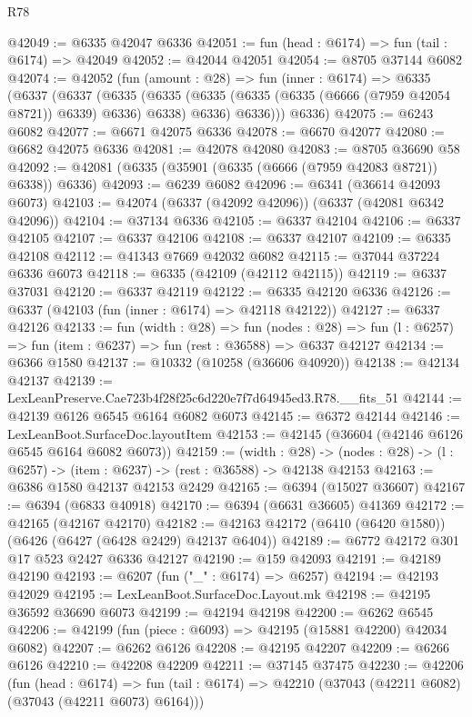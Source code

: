 \begin{lexlean}{R78}
\begin{coremodule}
@42049 := @6335 @42047 @6336
@42051 := fun (head : @6174) => fun (tail : @6174) => @42049
@42052 := @42044 @42051
@42054 := @8705 @37144 @6082
@42074 := @42052
    (fun (amount : @28) =>
    fun (inner : @6174) =>
    @6335
      (@6337
        (@6337
          (@6335
            (@6335 (@6335 (@6335 (@6335 (@6666 (@7959 @42054 @8721)) @6339) @6336) @6338) @6336)
            @6336)))
      @6336)
@42075 := @6243 @6082
@42077 := @6671 @42075 @6336
@42078 := @6670 @42077
@42080 := @6682 @42075 @6336
@42081 := @42078 @42080
@42083 := @8705 @36690 @58
@42092 := @42081 (@6335 (@35901 (@6335 (@6666 (@7959 @42083 @8721)) @6338)) @6336)
@42093 := @6239 @6082
@42096 := @6341 (@36614 @42093 @6073)
@42103 := @42074 (@6337 (@42092 @42096)) (@6337 (@42081 @6342 @42096))
@42104 := @37134 @6336
@42105 := @6337 @42104
@42106 := @6337 @42105
@42107 := @6337 @42106
@42108 := @6337 @42107
@42109 := @6335 @42108
@42112 := @41343 @7669 @42032 @6082
@42115 := @37044 @37224 @6336 @6073
@42118 := @6335 (@42109 (@42112 @42115))
@42119 := @6337 @37031
@42120 := @6337 @42119
@42122 := @6335 @42120 @6336
@42126 := @6337 (@42103 (fun (inner : @6174) => @42118 @42122))
@42127 := @6337 @42126
@42133 := fun (width : @28) =>
  fun (nodes : @28) => fun (l : @6257) => fun (item : @6237) => fun (rest : @36588) => @6337 @42127
@42134 := @6366 @1580
@42137 := @10332 (@10258 (@36606 @40920))
@42138 := @42134 @42137
@42139 := LexLeanPreserve.Cae723b4f28f25c6d220e7f7d64945ed3.R78.__fits_51
@42144 := @42139 @6126 @6545 @6164 @6082 @6073
@42145 := @6372 @42144
@42146 := LexLeanBoot.SurfaceDoc.layoutItem
@42153 := @42145 (@36604 (@42146 @6126 @6545 @6164 @6082 @6073))
@42159 := (width : @28) ->
  (nodes : @28) -> (l : @6257) -> (item : @6237) -> (rest : @36588) -> @42138 @42153
@42163 := @6386 @1580 @42137 @42153 @2429
@42165 := @6394 (@15027 @36607)
@42167 := @6394 (@6833 @40918)
@42170 := @6394 (@6631 @36605) @41369
@42172 := @42165 (@42167 @42170)
@42182 := @42163 @42172 (@6410 (@6420 @1580)) (@6426 (@6427 (@6428 @2429) @42137 @6404))
@42189 := @6772 @42172 @301 @17 @523 @2427 @6336 @42127
@42190 := @159 @42093
@42191 := @42189 @42190
@42193 := @6207 (fun ("_" : @6174) => @6257)
@42194 := @42193 @42029
@42195 := LexLeanBoot.SurfaceDoc.Layout.mk
@42198 := @42195 @36592 @36690 @6073
@42199 := @42194 @42198
@42200 := @6262 @6545
@42206 := @42199 (fun (piece : @6093) => @42195 (@15881 @42200) @42034 @6082)
@42207 := @6262 @6126
@42208 := @42195 @42207
@42209 := @6266 @6126
@42210 := @42208 @42209
@42211 := @37145 @37475
@42230 := @42206
    (fun (head : @6174) =>
    fun (tail : @6174) => @42210 (@37043 (@42211 @6082) (@37043 (@42211 @6073) @6164)))

\end{coremodule}
\end{lexlean}
